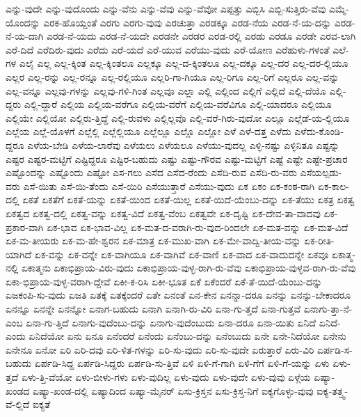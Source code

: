 {ಎನ್ನು-ವುದೇ
ಎನ್ನು-ವುದೊಂದು
ಎನ್ನು-ವೆನು
ಎನ್ನು-ವೆವು
ಎನ್ನು-ವೆವೋ
ಎಪ್ಪತ್ತು
ಎಬ್ಬಿಸಿ
ಎಬ್ಬಿ-ಸುತ್ತಿರು-ವೆವು
ಎಮ್ಮೆ-ಯೊಂದನ್ನು
ಎರಕ-ಹೊಯ್ದಂತೆ
ಎರಗು
ಎರಗು-ವುವು
ಎರಚುತ್ತಾ
ಎರಡಕ್ಕೂ
ಎರಡ-ನೆಯ
ಎರಡ-ನೆ-ಯ-ದನ್ನು
ಎರಡ-ನೆ-ಯ-ದಾಗಿ
ಎರಡ-ನೆ-ಯದು
ಎರಡ-ನೆ-ಯದೇ
ಎರಡನೇ
ಎರಡರ
ಎರಡ-ರಲ್ಲಿ
ಎರಡು
ಎರಡೂ
ಎರಡೇ
ಎರವ-ಲಾಗಿ
ಎರೆ-ದಿದೆ
ಎರೆದಿರು-ವುದು
ಎರೆದು
ಎರೆ-ಯದೆ
ಎರೆ-ಯುವ
ಎರೆಯು-ವುದು
ಎರೆ-ಯೋಣ
ಎರೆಹುಳು-ಗಳಂತೆ
ಎಲೆ-ಗಳ
ಎಲೈ
ಎಲ್ಲ
ಎಲ್ಲ-ಕ್ಕಿಂತ
ಎಲ್ಲ-ಕ್ಕಿಂತಲೂ
ಎಲ್ಲಕ್ಕೂ
ಎಲ್ಲ-ದ-ಕ್ಕಿಂತಲೂ
ಎಲ್ಲ-ದಕ್ಕೂ
ಎಲ್ಲ-ದರ
ಎಲ್ಲ-ದರ-ಲ್ಲಿಯೂ
ಎಲ್ಲರ
ಎಲ್ಲ-ರನ್ನು
ಎಲ್ಲ-ರನ್ನೂ
ಎಲ್ಲ-ರಲ್ಲಿಯೂ
ಎಲ್ಲರಿ-ಗಾ-ಗಿಯೂ
ಎಲ್ಲ-ರಿಗೂ
ಎಲ್ಲ-ರಿಗೆ
ಎಲ್ಲರೂ
ಎಲ್ಲ-ವನ್ನು
ಎಲ್ಲ-ವನ್ನೂ
ಎಲ್ಲವು-ಗಳನ್ನು
ಎಲ್ಲವು-ಗಳಿ-ಗಿಂತ
ಎಲ್ಲವೂ
ಎಲ್ಲಾ
ಎಲ್ಲಿ
ಎಲ್ಲಿಂದ
ಎಲ್ಲಿಗೆ
ಎಲ್ಲಿದೆ
ಎಲ್ಲಿ-ದೆಯೊ
ಎಲ್ಲಿ-ದ್ದರು
ಎಲ್ಲಿ-ದ್ದಾರೆ
ಎಲ್ಲಿಯ
ಎಲ್ಲಿಯ-ವರೆಗೂ
ಎಲ್ಲಿಯ-ವರೆಗೆ
ಎಲ್ಲಿಯ-ವರೆವಿಗೂ
ಎಲ್ಲಿ-ಯಾದರೂ
ಎಲ್ಲಿಯೂ
ಎಲ್ಲಿಯೇ
ಎಲ್ಲಿಯೋ
ಎಲ್ಲಿರು-ತ್ತಿದ್ದೆ
ಎಲ್ಲಿ-ರುವಳು
ಎಲ್ಲಿಲ್ಲವೊ
ಎಲ್ಲಿ-ವರೆ-ಗಿರು-ವುದೋ
ಎಲ್ಲೂ
ಎಲ್ಲೆಡೆ-ಯ-ಲ್ಲಿಯೂ
ಎಲ್ಲೆಯ
ಎಲ್ಲೆ-ಯೊಳಗೆ
ಎಲ್ಲೆಲ್ಲಿ
ಎಲ್ಲೆಲ್ಲಿಯೂ
ಎಲ್ಲೆಲ್ಲೂ
ಎಲ್ಲೊ
ಎಲ್ಲೋ
ಎಳೆ
ಎಳೆ-ದತ್ತ
ಎಳೆದು
ಎಳೆದು-ಕೊಂಡಿ-ದ್ದರೂ
ಎಳೆಯ-ಬೇಡಿ
ಎಳೆಯ-ಲಾರೆವು
ಎಳೆಯಲು
ಎಳೆಯಲೂ
ಎಳೆಯು-ವುದಲ್ಲ
ಎಳ್ಳಿ-ನಷ್ಟು
ಎಳ್ಳಿನಿತೂ
ಎಷ್ಟನ್ನು
ಎಷ್ಟರ
ಎಷ್ಟರ-ಮಟ್ಟಿಗೆ
ಎಷ್ಟಿದ್ದರೂ
ಎಷ್ಟಿರ-ಬಹುದು
ಎಷ್ಟು
ಎಷ್ಟು-ಗೌರವ
ಎಷ್ಟು-ಮಟ್ಟಿಗೆ
ಎಷ್ಟೆ
ಎಷ್ಟೇ
ಎಷ್ಟೇ-ಪ್ರಚಾರ
ಎಷ್ಟೊಂದನ್ನು
ಎಷ್ಟೊಂದು
ಎಷ್ಟೋ
ಎಸ-ಗಲು
ಎಸೆದ
ಎಸೆದ-ರೆಂದು
ಎಸೆದಿ-ರುವ
ಎಸೆದಿ-ರು-ವರು
ಎಸೆಯಲ್ಪಡು-ವರು
ಎಸೆ-ಯಿತು
ಎಸೆ-ಯಿ-ತೆಂದು
ಎಸೆ-ಯಿರಿ
ಎಸೆಯುತ್ತಾರೆ
ಎಸೆಯು-ವುದು
ಏಕ
ಏಕಂ
ಏಕ-ಕಂಠ-ರಾಗಿ
ಏಕ-ಕಾಲ-ದಲ್ಲಿ
ಏಕತೆ
ಏಕತೆಗೆ
ಏಕತೆ-ಯನ್ನು
ಏಕತೆ-ಯಿಂದ
ಏಕತೆ-ಯಿಲ್ಲ
ಏಕತೆ-ಯಿದೆ-ಯೆಂಬು-ದನ್ನು
ಏಕ-ತೆಯು
ಏಕತ್ರ
ಏಕತ್ವ
ಏಕತ್ವದ
ಏಕತ್ವ-ದಲ್ಲಿ
ಏಕತ್ವ-ವನ್ನು
ಏಕತ್ವ-ವಿದೆ
ಏಕತ್ವ-ವೆಂಬ
ಏಕತ್ವವೇ
ಏಕ-ದೃಷ್ಟಿ
ಏಕ-ದೇವ-ತಾ-ವಾದವು
ಏಕ-ಪ್ರಕಾರ-ವಾಗಿ
ಏಕ-ಭಾವ
ಏಕ-ಭಾವ-ವಿಲ್ಲ
ಏಕ-ಮತ-ದ-ವರಾಗಿ-ರು-ವುದ-ರಿಂದಲೇ
ಏಕ-ಮತ-ವನ್ನು
ಏಕ-ಮತ-ವಿದೆ
ಏಕ-ಮ-ತೀಯರು
ಏಕ-ಮ-ಹೇ-ಶ್ವರನ
ಏಕ-ಮಾತ್ರ
ಏಕ-ಮುಖ-ವಾಗಿ
ಏಕ-ಮೇ-ವಾದ್ವಿ-ತೀಯ-ವನ್ನು
ಏಕ-ರೀತಿ-ಯಾಗಿದೆ
ಏಕ-ವನ್ನು
ಏಕ-ವನ್ನೇ
ಏಕ-ವಾಗಿಯೂ
ಏಕ-ವಾಗಿವೆ
ಏಕ-ವಾಣಿ
ಏಕ-ವಾದ
ಏಕ-ವಾದುದನ್ನೇ
ಏಕವೂ
ಏಕಾತ್ಮ-ನಲ್ಲಿ
ಏಕಾತ್ಮನು
ಏಕಾಭಿಪ್ರಾಯ-ವಿರು-ವುದು
ಏಕಾಭಿಪ್ರಾಯ-ವುಳ್ಳ-ರಾಗಿ-ರು-ವೆವು
ಏಕಾಭಿಪ್ರಾಯ-ವುಳ್ಳವ-ರಾಗಿ-ರು-ವೆವು
ಏಕಾ-ಭಿಪ್ರಾಯ-ವುಳ್ಳ-ವರಾಗಿ-ದ್ದೇವೆ
ಏಕೀ-ಕ-ರಿಸಿ
ಏಕೀ-ಭೂತ
ಏಕೆ
ಏಕೆಂದರೆ
ಏಕೆ-ತೆ-ಯಿದೆ-ಯೆಂಬು-ದನ್ನು
ಏಜಕಂಪಿ-ಸು-ವುದು
ಏಜತಿ
ಏತಕ್ಕೆ
ಏತಕ್ಕೆಂದರೆ
ಏತೇ
ಏನಂತೆ
ಏನ-ಕೇನ
ಏನನ್ನಾ-ದರೂ
ಏನನ್ನು
ಏನನ್ನು-ಬೇಕಾದರೂ
ಏನನ್ನೂ
ಏನನ್ನೇ
ಏನನ್ನೋ
ಏನಾಗ-ಬಹುದು
ಏನಾಗಿ
ಏನಾಗಿ-ರು-ವಿರಿ
ಏನಾ-ಗು-ತ್ತದೆ
ಏನಾ-ಗುತ್ತವೆ
ಏನಾಗು-ತ್ತಾ-ನೆ-ಎಂಬ
ಏನಾ-ಗು-ತ್ತಿದೆ
ಏನಾಗು-ವುದೆಂಬು-ದನ್ನು
ಏನಾಗು-ವುದೆಂಬುದು
ಏನಾ-ದರೂ
ಏನಾ-ಯಿತು
ಏನಿದೆ
ಏನಿದೆ-ಎಂದು
ಏನಿದೆಯೋ
ಏನು
ಏನೂ
ಏನೆಂದರೆ
ಏನೆಂದು
ಏನೆಂಬು-ದನ್ನು
ಏನೆಂಬುದು
ಏನೇ
ಏನೇ-ನಿದೆಯೋ
ಏನೇನು
ಏನೇನೂ
ಏನೋ
ಏರಿ
ಏರಿ-ದವು
ಏರಿ-ಳಿತ-ಗಳನ್ನು
ಏರಿ-ಸು-ವುದು
ಏರಿ-ಸು-ವುದೇ
ಏರುತ್ತಾರೆ
ಏರು-ವಿರಿ
ಏರ್ಪಡಿ-ಸ-ಬಹುದು
ಏರ್ಪಡಿ-ಸಿದ್ದ
ಏರ್ಪಡಿ-ಸಿದ್ದರು
ಏರ್ಪಡಿ-ಸು-ತ್ತಿವೆ
ಏಳಿ
ಏಳಿ-ಗೆ-ಗಾಗಿ
ಏಳಿ-ಗೆಗೆ
ಏಳಿ-ಗೆ-ಯನ್ನು
ಏಳು
ಏಳು-ತ್ತದೆ
ಏಳು-ತ್ತಿ-ವೆಯೋ
ಏಳು-ಬೀಳು-ಗಳು
ಏಳು-ವುದಿಲ್ಲ
ಏಳು-ವುದು
ಏಳು-ವುದೇ
ಏಳು-ವುವು
ಏಳ್ಗೆಯ
ಏಷ್ಯಾ-ಖಂಡದ
ಏಷ್ಯಾ-ಖಂಡ-ದಲ್ಲಿ
ಏಷ್ಯಾದಿಂದ
ಏಷ್ಯಾ-ಮೈನರ್
ಏಸು-ಕ್ರಿಸ್ತನ
ಏಸು-ಕ್ರಿಸ್ತ-ನಿಗೆ
ಐಕ್ಯಗೊಳ್ಳು-ವುವು
ಐಕ್ಯ-ತತ್ತ್ವ-ವೆ-ಲ್ಲಿದೆ
ಐಕ್ಯತೆ
}
